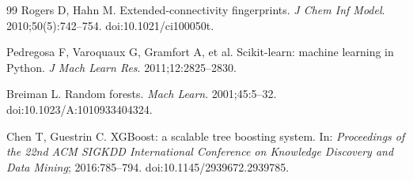 \begin{thebibliography}{99}
Rogers D, Hahn M. Extended-connectivity fingerprints. \textit{J Chem Inf Model}. 2010;50(5):742--754. doi:10.1021/ci100050t.

Pedregosa F, Varoquaux G, Gramfort A, et al. Scikit-learn: machine learning in Python. \textit{J Mach Learn Res}. 2011;12:2825--2830.

Breiman L. Random forests. \textit{Mach Learn}. 2001;45:5--32. doi:10.1023/A:1010933404324.

Chen T, Guestrin C. XGBoost: a scalable tree boosting system. In: \textit{Proceedings of the 22nd ACM SIGKDD International Conference on Knowledge Discovery and Data Mining}; 2016:785--794. doi:10.1145/2939672.2939785.

\end{thebibliography}
